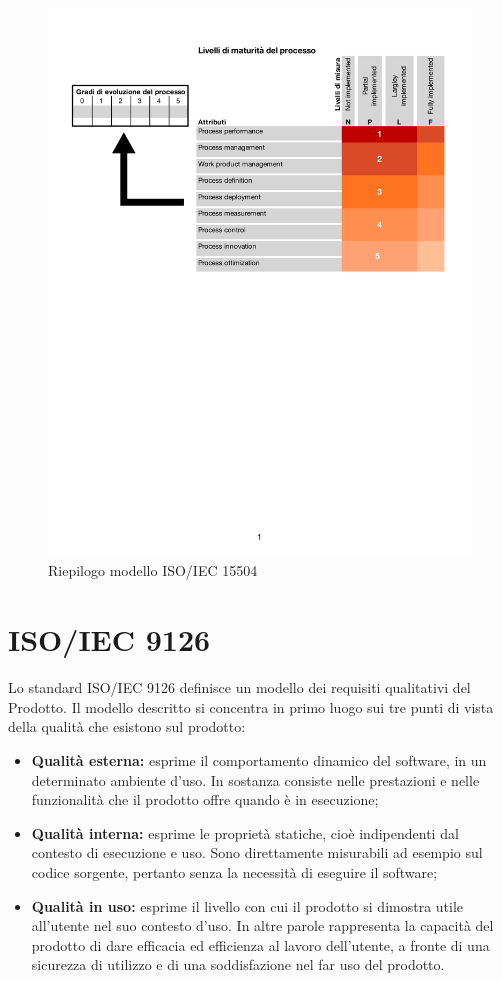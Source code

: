 	\begin{figure}[htbp]
	\centering
	\includegraphics[scale=0.7]{images/ISOIEC15504.pdf}
	\caption{Riepilogo modello ISO/IEC 15504}
	\end{figure}
\section{ISO/IEC 9126}
Lo standard ISO/IEC 9126 definisce un modello dei requisiti qualitativi del Prodotto.
	  Il modello descritto si concentra in primo luogo sui tre punti di vista della qualità che esistono sul prodotto:
	  \begin{itemize}
	  \item \textbf{Qualità esterna:} esprime il comportamento dinamico del software, in un determinato ambiente d'uso. In sostanza consiste nelle prestazioni e nelle funzionalità che il prodotto offre quando è in esecuzione;
	  \item \textbf{Qualità interna:} esprime le proprietà statiche, cioè
indipendenti dal contesto di esecuzione e uso. Sono direttamente misurabili ad esempio sul
codice sorgente, pertanto senza la necessità di eseguire il software;
	  \item \textbf{Qualità in uso:} esprime il livello con cui il prodotto si dimostra utile all'utente nel suo contesto d'uso. In altre parole rappresenta la capacità del prodotto di dare efficacia ed efficienza al lavoro dell'utente, a fronte di una sicurezza di utilizzo e di una soddisfazione nel far uso del prodotto.
	  \end{itemize}
